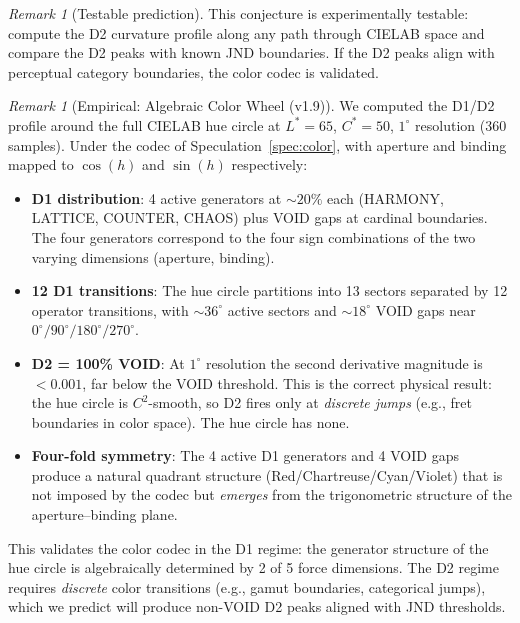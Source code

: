 \documentclass[11pt]{article}
\theoremstyle{definition}
\theoremstyle{remark}
\newtheorem{remark}[theorem]{Remark}
\begin{document}
\begin{remark}[Testable prediction]
This conjecture is experimentally testable: compute the D2 curvature profile along
any path through CIELAB space and compare the D2 peaks with known JND boundaries.
If the D2 peaks align with perceptual category boundaries, the color codec is validated.
\end{remark}


\begin{remark}[Empirical: Algebraic Color Wheel (v1.9)]
\label{rem:color-wheel}
We computed the D1/D2 profile around the full CIELAB hue circle at
$L^{*}=65$, $C^{*}=50$, $1^{\circ}$ resolution (360 samples).
Under the codec of Speculation~\ref{spec:color}, with aperture and binding
mapped to $\cos(h)$ and $\sin(h)$ respectively:

\begin{itemize}[nosep]
  \item \textbf{D1 distribution}: 4 active generators at $\sim 20\%$ each
    (HARMONY, LATTICE, COUNTER, CHAOS) plus VOID gaps at cardinal
    boundaries.  The four generators correspond to the four sign
    combinations of the two varying dimensions (aperture, binding).
  \item \textbf{12 D1 transitions}: The hue circle partitions into 13
    sectors separated by 12 operator transitions, with $\sim 36^{\circ}$
    active sectors and $\sim 18^{\circ}$ VOID gaps near $0^{\circ}/90^{\circ}/180^{\circ}/270^{\circ}$.
  \item \textbf{D2 = 100\% VOID}: At $1^{\circ}$ resolution the second
    derivative magnitude is $< 0.001$, far below the VOID threshold.
    This is the correct physical result: the hue circle is $C^{2}$-smooth,
    so D2 fires only at \emph{discrete jumps} (e.g., fret boundaries in
    color space).  The hue circle has none.
  \item \textbf{Four-fold symmetry}: The 4 active D1 generators and 4
    VOID gaps produce a natural quadrant structure
    (Red/Chartreuse/Cyan/Violet) that is not imposed by the codec but
    \emph{emerges} from the trigonometric structure of the aperture--binding
    plane.
\end{itemize}

This validates the color codec in the D1 regime: the generator structure
of the hue circle is algebraically determined by 2 of 5 force dimensions.
The D2 regime requires \emph{discrete} color transitions (e.g., gamut
boundaries, categorical jumps), which we predict will produce non-VOID D2
peaks aligned with JND thresholds.
\end{remark}
\end{document}
